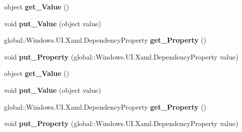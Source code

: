 \begin{DoxyCompactItemize}
\item 
\mbox{\label{interface_windows_1_1_u_i_1_1_xaml_1_1_i_setter_a6f3c52ea80a2e55872c6f70db27a650d}} 
object {\bfseries get\+\_\+\+Value} ()
\item 
\mbox{\label{interface_windows_1_1_u_i_1_1_xaml_1_1_i_setter_a222ce9a11d2ca442e2176a98682d4ff0}} 
void {\bfseries put\+\_\+\+Value} (object value)
\item 
\mbox{\label{interface_windows_1_1_u_i_1_1_xaml_1_1_i_setter_a3caf5fdfe02e38278e49afff4712f70c}} 
global\+::\+Windows.\+U\+I.\+Xaml.\+Dependency\+Property {\bfseries get\+\_\+\+Property} ()
\item 
\mbox{\label{interface_windows_1_1_u_i_1_1_xaml_1_1_i_setter_ab28bb64021366fee0d6ff823631c77ba}} 
void {\bfseries put\+\_\+\+Property} (global\+::\+Windows.\+U\+I.\+Xaml.\+Dependency\+Property value)
\item 
\mbox{\label{interface_windows_1_1_u_i_1_1_xaml_1_1_i_setter_a6f3c52ea80a2e55872c6f70db27a650d}} 
object {\bfseries get\+\_\+\+Value} ()
\item 
\mbox{\label{interface_windows_1_1_u_i_1_1_xaml_1_1_i_setter_a222ce9a11d2ca442e2176a98682d4ff0}} 
void {\bfseries put\+\_\+\+Value} (object value)
\item 
\mbox{\label{interface_windows_1_1_u_i_1_1_xaml_1_1_i_setter_a3caf5fdfe02e38278e49afff4712f70c}} 
global\+::\+Windows.\+U\+I.\+Xaml.\+Dependency\+Property {\bfseries get\+\_\+\+Property} ()
\item 
\mbox{\label{interface_windows_1_1_u_i_1_1_xaml_1_1_i_setter_ab28bb64021366fee0d6ff823631c77ba}} 
void {\bfseries put\+\_\+\+Property} (global\+::\+Windows.\+U\+I.\+Xaml.\+Dependency\+Property value)
\item 
\mbox{\label{interface_windows_1_1_u_i_1_1_xaml_1_1_i_setter_a6f3c52ea80a2e55872c6f70db27a650d}} 

\end{DoxyCompactItemize}
